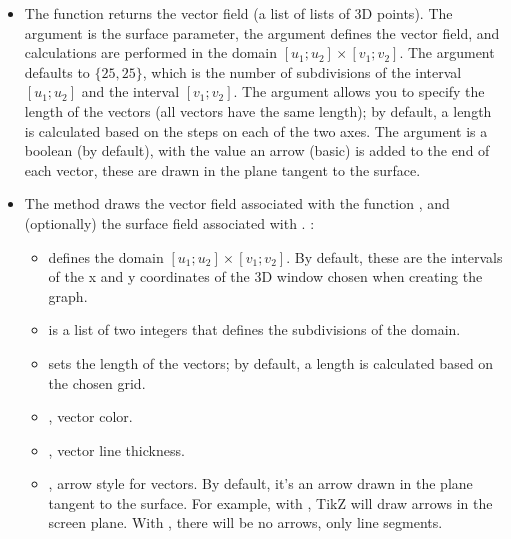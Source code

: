 \begin{itemize}
    \item The function  returns the vector field (a list of lists of 3D points). The argument  is the surface parameter, the argument  defines the vector field, and calculations are performed in the domain $[u_1;u_2]\times[v_1;v_2]$. The argument  defaults to $\{25,25\}$, which is the number of subdivisions of the interval $[u_1;u_2]$ and the interval $[v_1;v_2]$. The argument  allows you to specify the length of the vectors (all vectors have the same length); by default, a length is calculated based on the steps on each of the two axes. The argument  is a boolean (\false by default), with the value \true an arrow (basic) is added to the end of each vector, these are drawn in the plane tangent to the surface.
    
    \item The method  draws the vector field associated with the function , and (optionally) the surface field associated with . \writeoptions:
    \begin{itemize}
        \item {} defines the domain $[u_1;u_2]\times [v_1;v_2]$. By default, these are the intervals of the x and y coordinates of the 3D window chosen when creating the graph.

        \item {} is a list of two integers that defines the subdivisions of the domain.

        \item {} sets the length of the vectors; by default, a length is calculated based on the chosen grid.

        \item {}, vector color.

        \item {}, vector line thickness.

        \item {}, arrow style for vectors. By default, it's an arrow drawn in the plane tangent to the surface. For example, with , TikZ will draw arrows in the screen plane. With , there will be no arrows, only line segments.


\end{itemize}
\end{itemize}
